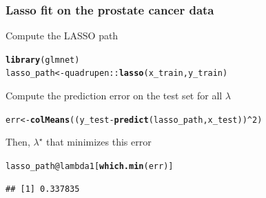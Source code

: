 \documentclass[10pt, c, xcolor=x11names]{beamer}\usepackage[]{graphicx}\usepackage[]{color}
\makeatletter
\newcommand{\hlnum}[1]{\textcolor[rgb]{0.686,0.059,0.569}{#1}}%
\newcommand{\hlopt}[1]{\textcolor[rgb]{0,0,0}{#1}}%
\newcommand{\hlstd}[1]{\textcolor[rgb]{0.345,0.345,0.345}{#1}}%
\newcommand{\hlkwb}[1]{\textcolor[rgb]{0.69,0.353,0.396}{#1}}%
\newcommand{\hlkwc}[1]{\textcolor[rgb]{0.333,0.667,0.333}{#1}}%
\newcommand{\hlkwd}[1]{\textcolor[rgb]{0.737,0.353,0.396}{\textbf{#1}}}%
\newenvironment{kframe}{%
 \def\at@end@of@kframe{}%
 \ifinner\ifhmode%
  \def\at@end@of@kframe{\end{minipage}}%
  \begin{minipage}{\columnwidth}%
 \fi\fi%
 \def\FrameCommand##1{\hskip\@totalleftmargin \hskip-\fboxsep
 \colorbox{shadecolor}{##1}\hskip-\fboxsep
     \hskip-\linewidth \hskip-\@totalleftmargin \hskip\columnwidth}%
 \MakeFramed {\advance\hsize-\width
   \@totalleftmargin\z@ \linewidth\hsize
   \@setminipage}}%
 {\par\unskip\endMakeFramed%
 \at@end@of@kframe}
\newenvironment{knitrout}{}{} %
\makeatother
\begin{document}
\begin{frame}
  \frametitle{Lasso fit on the prostate cancer data}

  \vfill
Compute the LASSO path
\begin{knitrout}\scriptsize
{}\color{fgcolor}\begin{kframe}
\begin{alltt}
\hlkwd{library}\hlstd{(glmnet)}
\hlstd{lasso_path} \hlkwb{<-} \hlstd{quadrupen}\hlopt{::}\hlkwd{lasso}\hlstd{(x_train,y_train)}
\end{alltt}
\end{kframe}
\end{knitrout}

\vfill

Compute the prediction error on the test set for all $\lambda$

\begin{knitrout}\scriptsize
{}\color{fgcolor}\begin{kframe}
\begin{alltt}
\hlstd{err} \hlkwb{<-} \hlkwd{colMeans}\hlstd{((y_test} \hlopt{-} \hlkwd{predict}\hlstd{(lasso_path, x_test))}\hlopt{^}\hlnum{2}\hlstd{)}
\end{alltt}
\end{kframe}
\end{knitrout}

\vfill

Then, $\lambda^\star$ that minimizes this error
\begin{knitrout}\scriptsize
{}\color{fgcolor}\begin{kframe}
\begin{alltt}
\hlstd{lasso_path}\hlopt{@}\hlkwc{lambda1}\hlstd{[}\hlkwd{which.min}\hlstd{(err)]}
\end{alltt}
\begin{verbatim}
## [1] 0.337835
\end{verbatim}
\end{kframe}
\end{knitrout}

\framebreak


\end{frame}
\end{document}
